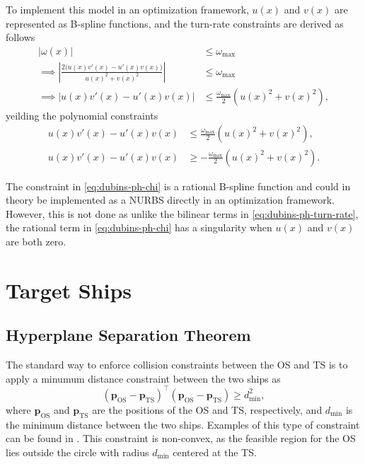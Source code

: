 To implement this model in an optimization framework, $u(x)$ and $v(x)$ are represented as B-spline functions, and the turn-rate constraints are derived as follows
\begin{equation}
    \begin{aligned}
        |\omega(x)| &\le \omega_{\max} \\
        \implies \left|\frac{2\big(u(x)v'(x) - u'(x)v(x)\big)}{u(x)^2 + v(x)^2}\right| &\le \omega_{\max} \\
        \implies \left|u(x)v'(x) - u'(x)v(x)\right| &\le \frac{\omega_{\max}}{2}\left(u(x)^2 + v(x)^2\right),
    \end{aligned}
\end{equation}
yeilding the polynomial constraints
\begin{subequations}\label{eq:dubins-ph-turn-rate}
    \begin{align}
        u(x)v'(x) - u'(x)v(x) &\le \frac{\omega_{\max}}{2}\left(u(x)^2 + v(x)^2\right), \\
        u(x)v'(x) - u'(x)v(x) &\ge -\frac{\omega_{\max}}{2}\left(u(x)^2 + v(x)^2\right).
    \end{align}
\end{subequations}

The constraint in \cref{eq:dubins-ph-chi} is a rational B-spline function and could in theory be implemented as a NURBS directly in an optimization framework. However, this is not done as unlike the bilinear terms in \cref{eq:dubins-ph-turn-rate}, the rational term in \cref{eq:dubins-ph-chi} has a singularity when $u(x)$ and $v(x)$ are both zero.


\section{Target Ships}

\subsection{Hyperplane Separation Theorem}
The standard way to enforce collision constraints between the OS and TS is to apply a minumum distance constraint between the two ships as
\begin{equation}\label{eq:minimum-distance}
    (\mathbf p_{\text{OS}} - \mathbf p_{\text{TS}})^\top (\mathbf p_{\text{OS}} - \mathbf p_{\text{TS}}) \geq d_{\text{min}}^2,
\end{equation}
where $\mathbf p_{\text{OS}}$ and $\mathbf p_{\text{TS}}$ are the positions of the OS and TS, respectively, and $d_{\text{min}}$ is the minimum distance between the two ships. Examples of this type of constraint can be found in \cite{Thyri2022-MPC}. This constraint is non-convex, as the feasible region for the OS lies outside the circle with radius $d_{\text{min}}$ centered at the TS.

